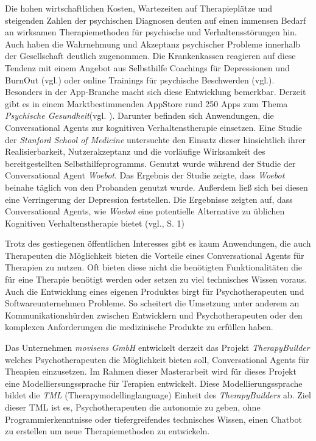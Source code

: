 Die hohen wirtschaftlichen Kosten, Wartezeiten auf Therapieplätze und steigenden Zahlen der psychischen Diagnosen deuten auf einen immensen Bedarf an wirksamen Therapiemethoden für psychische und Verhaltensstörungen hin. Auch haben die Wahrnehmung und Akzeptanz psychischer Probleme innerhalb der Gesellschaft deutlich zugenommen. Die Krankenkassen reagieren auf diese Tendenz mit einem Angebot aus Selbsthilfe Coachings für Depressionen und BurnOut (vgl.\cite{Hilfebei71:online}\cite{TKDepres18:online}) oder online Trainings für psychische Beschwerden (vgl.\cite{PROMIND78:online}). Besonders in der App-Branche macht sich diese Entwicklung bemerkbar. Derzeit gibt es in einem Marktbestimmenden AppStore rund 250 Apps zum Thema \emph{Psychische Gesundheit}(vgl. \cite{psychisc90:online}). Darunter befinden sich Anwendungen, die Conversational Agents zur kognitiven Verhaltenstherapie einsetzen. Eine Studie der \emph{Stanford School of Medicine} untersuchte den Einsatz dieser hinsichtlich ihrer Realisierbarkeit, Nutzerakzeptanz und die vorläufige Wirksamkeit des bereitgestellten Selbsthilfeprogramms. Genutzt wurde während der Studie der Conversational Agent \emph{Woebot}. Das Ergebnis der Studie zeigte, dass \emph{Woebot} beinahe täglich von den Probanden genutzt wurde. Außerdem ließ sich bei diesen eine Verringerung der Depression feststellen. Die Ergebnisse zeigten auf, dass Conversational Agents, wie \emph{Woebot} eine potentielle Alternative zu üblichen Kognitiven Verhaltenstherapie bietet (vgl.\cite{Hany1997}, S. 1) 

Trotz des gestiegenen öffentlichen Interesses  gibt es kaum Anwendungen, die auch Therapeuten die Möglichkeit bieten die Vorteile eines Conversational Agents für Therapien zu nutzen. Oft bieten diese nicht die benötigten Funktionalitäten die für eine Therapie benötigt werden oder setzen zu viel technisches Wissen voraus. Auch die Entwicklung eines eigenen Produktes birgt für Psychotherapeuten und Softwareunternehmen Probleme. So scheitert die Umsetzung unter anderem an Kommunikationshürden zwischen Entwicklern und Psychotherapeuten oder den komplexen Anforderungen die medizinische Produkte zu erfüllen haben. 

Das Unternehmen \emph{movisens GmbH} entwickelt derzeit das Projekt \emph{TherapyBuilder} welches Psychotherapeuten die Möglichkeit bieten soll, Conversational Agents für Theapien einzusetzen. Im Rahmen dieser Masterarbeit wird für dieses Projekt eine Modelliersungssprache für Terapien entwickelt. Diese Modellierungssprache bildet die \emph{TML} (Therapymodellinglanguage) Einheit des \emph{TherapyBuilders} ab.  Ziel dieser TML ist es, Psychotherapeuten die autonomie zu geben, ohne Programmierkenntnisse oder tiefergreifendes technisches Wissen, einen Chatbot zu erstellen um neue Therapiemethoden zu entwickeln.



